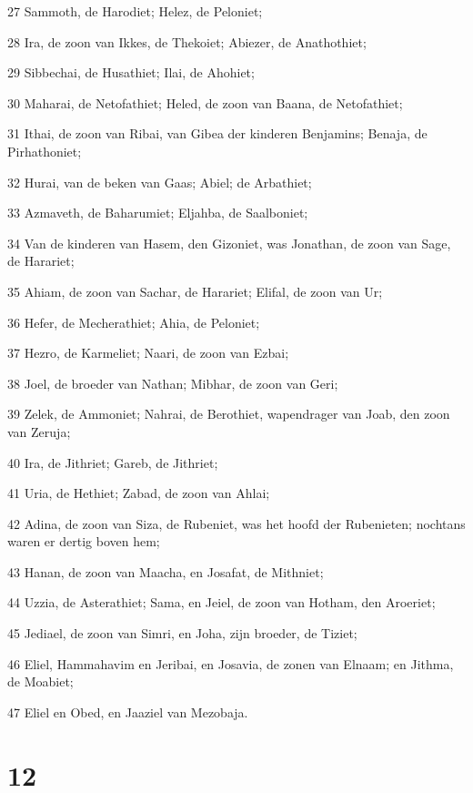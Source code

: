 \par 27 Sammoth, de Harodiet; Helez, de Peloniet;
\par 28 Ira, de zoon van Ikkes, de Thekoiet; Abiezer, de Anathothiet;
\par 29 Sibbechai, de Husathiet; Ilai, de Ahohiet;
\par 30 Maharai, de Netofathiet; Heled, de zoon van Baana, de Netofathiet;
\par 31 Ithai, de zoon van Ribai, van Gibea der kinderen Benjamins; Benaja, de Pirhathoniet;
\par 32 Hurai, van de beken van Gaas; Abiel; de Arbathiet;
\par 33 Azmaveth, de Baharumiet; Eljahba, de Saalboniet;
\par 34 Van de kinderen van Hasem, den Gizoniet, was Jonathan, de zoon van Sage, de Harariet;
\par 35 Ahiam, de zoon van Sachar, de Harariet; Elifal, de zoon van Ur;
\par 36 Hefer, de Mecherathiet; Ahia, de Peloniet;
\par 37 Hezro, de Karmeliet; Naari, de zoon van Ezbai;
\par 38 Joel, de broeder van Nathan; Mibhar, de zoon van Geri;
\par 39 Zelek, de Ammoniet; Nahrai, de Berothiet, wapendrager van Joab, den zoon van Zeruja;
\par 40 Ira, de Jithriet; Gareb, de Jithriet;
\par 41 Uria, de Hethiet; Zabad, de zoon van Ahlai;
\par 42 Adina, de zoon van Siza, de Rubeniet, was het hoofd der Rubenieten; nochtans waren er dertig boven hem;
\par 43 Hanan, de zoon van Maacha, en Josafat, de Mithniet;
\par 44 Uzzia, de Asterathiet; Sama, en Jeiel, de zoon van Hotham, den Aroeriet;
\par 45 Jediael, de zoon van Simri, en Joha, zijn broeder, de Tiziet;
\par 46 Eliel, Hammahavim en Jeribai, en Josavia, de zonen van Elnaam; en Jithma, de Moabiet;
\par 47 Eliel en Obed, en Jaaziel van Mezobaja.

\chapter{12}

